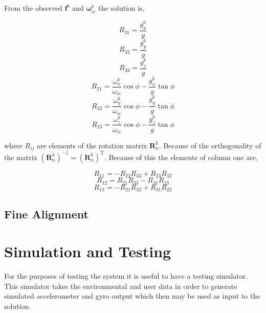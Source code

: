\documentclass[a4paper]{report}
\numberwithin{equation}{chapter}
\newcommand{\mat}[1]{\boldsymbol{#1}}
\begin{document}
From the observed $\mat{f}^b$ and $\mat{\omega}^b_{ie}$ the solution is,

\begin{equation}
R_{31} = \frac{g^b_x}{g}
\end{equation}
\begin{equation}
R_{32} = \frac{g^b_y}{g}
\end{equation}
\begin{equation}
R_{33} = \frac{g^b_z}{g}
\end{equation}
\begin{equation}
R_{21} = \frac{\omega^b_x}{\omega_{ie}} \cos{\phi} - \frac{g^b_x}{g} \tan{\phi}
\end{equation}
\begin{equation}
R_{22} = \frac{\omega^b_y}{\omega_{ie}} \cos{\phi} - \frac{g^b_y}{g} \tan{\phi}
\end{equation}
\begin{equation}
R_{23} = \frac{\omega^b_z}{\omega_{ie}} \cos{\phi} - \frac{g^b_z}{g} \tan{\phi}
\end{equation}

where $R_{ij}$ are elements of the rotation matrix $\mat{R}^b_n$. Because of the orthogonality of the matrix $\left(\mat{R}^b_n\right)^{-1} = \left(\mat{R}^b_n\right)^{\mathrm{T}}$. Because of this the elements of column one are,

\begin{equation}
R_{11} = -R_{22}R_{33} + R_{23}R_{32}
\end{equation}
\begin{equation}
R_{12} = R_{21}R_{33} - R_{31}R_{23}
\end{equation}
\begin{equation}
R_{13} = -R_{21}R_{32} + R_{31}R_{22}
\end{equation}

\subsection[Fine Alignment]{Fine Alignment}



\section[Simulation and Testing]{Simulation and Testing}

For the purposes of testing the system it is useful to have a testing simulator. This simulator takes the environmental and user data in order to generate simulated accelerometer and gyro output which then may be used as input to the solution.
\end{document}
